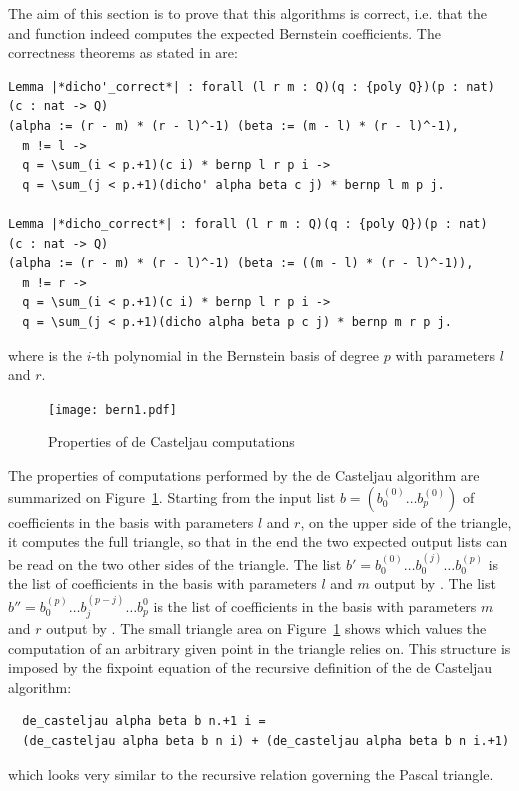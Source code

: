 \documentclass{mscs}
\begin{document}
The aim of this section is to prove that this algorithms is
correct, i.e. that the  and  function
indeed computes the expected Bernstein coefficients. The correctness
theorems as stated in \Coq{} are:
\begin{lstlisting}
Lemma |*dicho'_correct*| : forall (l r m : Q)(q : {poly Q})(p : nat)
(c : nat -> Q)
(alpha := (r - m) * (r - l)^-1) (beta := (m - l) * (r - l)^-1),
  m != l ->
  q = \sum_(i < p.+1)(c i) * bernp l r p i ->
  q = \sum_(j < p.+1)(dicho' alpha beta c j) * bernp l m p j.

Lemma |*dicho_correct*| : forall (l r m : Q)(q : {poly Q})(p : nat)
(c : nat -> Q)
(alpha := (r - m) * (r - l)^-1) (beta := ((m - l) * (r - l)^-1)),
  m != r ->
  q = \sum_(i < p.+1)(c i) * bernp l r p i ->
  q = \sum_(j < p.+1)(dicho alpha beta p c j) * bernp m r p j.
\end{lstlisting}
where  is the $i$-th polynomial in the Bernstein
basis of degree $p$ with parameters $l$ and $r$.
\begin{figure}[ht]
\begin{center}
\texttt{[image: bern1.pdf]}
\end{center}
\caption{\label{bern} Properties of de Casteljau computations}
\end{figure}


The properties of computations performed by the de Casteljau algorithm
are summarized on Figure~\ref{bern}. Starting from the input list
$b = (b_0^{(0)}\dots b_p^{(0)})$ of coefficients in the basis with
parameters $l$ and $r$, on the upper side of the triangle, it
computes the full triangle, so that in the end the two expected output
lists can be read on the two  other sides of the triangle. The list
$b' = b_0^{(0)} \dots b_0^{(j)} \dots b_0^{(p)}$ is the list of
coefficients in the basis with parameters $l$ and $m$ output by
. The list
$b'' = b_0^{(p)} \dots b_j^{(p - j)} \dots b_p^{0}$
 is the list of coefficients in the basis with parameters $m$ and $r$
 output by .  The small triangle area on Figure~\ref{bern} shows which values
the computation of an arbitrary given point in the triangle relies on.
This structure is imposed by the fixpoint
 equation of the recursive definition of the de Casteljau algorithm:
\begin{lstlisting}
  de_casteljau alpha beta b n.+1 i =
  (de_casteljau alpha beta b n i) + (de_casteljau alpha beta b n i.+1)
\end{lstlisting}
which looks very similar to the recursive relation governing the
Pascal triangle.
\end{document}
